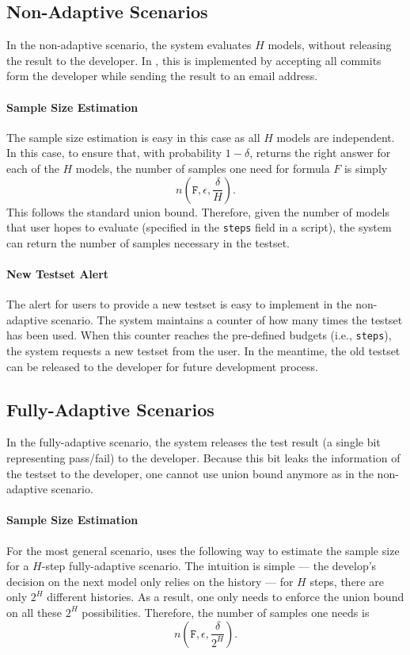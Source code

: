 \documentclass{article}
\begin{document}
\subsection{Non-Adaptive Scenarios}

In the non-adaptive scenario, the system evaluates 
$H$ models, without releasing the result to 
the developer. In \sys, this is implemented by
accepting all commits form the developer while
sending the result to an email address.

\paragraph*{Sample Size Estimation} The sample
size estimation is easy in this case as all
$H$ models are independent. In this case,
to ensure that, with probability $1-\delta$,
\sys returns the right answer for each of the
$H$ models, the number of samples one need
for formula $F$ is simply
\[
n(\texttt{F}, \epsilon, \frac{\delta}{H}).
\]
This follows the standard union bound. 
Therefore, given the number of models that
user hopes to evaluate (specified 
in the \texttt{steps} field in a \sys script),
the system can return the number of samples
necessary in the testset.

\paragraph*{New Testset Alert} The alert 
for users to provide a new testset is
easy to implement in the non-adaptive scenario.
The system maintains a counter of how many 
times the testset has been used. When 
this counter reaches the pre-defined 
budgets (i.e., \texttt{steps}), the system
requests a new testset from the user.
In the meantime, the old testset can be 
released to the developer for future development
process.

\subsection{Fully-Adaptive Scenarios}

In the fully-adaptive scenario, the system releases
the test result (a single bit representing pass/fail)
to the developer. Because this bit leaks the information
of the testset to the developer, one cannot use
union bound anymore as in the non-adaptive scenario.

\paragraph*{Sample Size Estimation} For the 
most general scenario, \sys uses the following way
to estimate the sample size for a $H$-step 
fully-adaptive scenario. The intuition is simple ---
the develop's decision on the next model only
relies on the history --- for $H$ steps, there are
only $2^H$ different histories. As a result, one
only needs to enforce the union bound on all
these $2^H$ possibilities. Therefore, the number
of samples one needs is
\[
n(\texttt{F}, \epsilon, \frac{\delta}{2^H}).
\]
\end{document}
